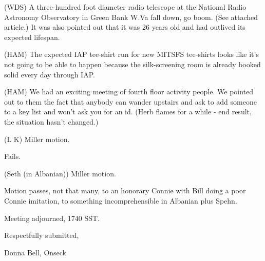 \documentclass[12pt]{article}
\begin{document}
(WDS) A three-hundred foot diameter radio telescope at the National Radio Astronomy Observatory in Green Bank W.Va fall down, go boom. (See attached article.) It was also pointed out that it was 26 years old and had outlived its expected lifespan.

(HAM) The expected IAP tee-shirt run for new MITSFS tee-shirts looks like it's not going to be able to happen because the silk-screening room is already booked solid every day through IAP.

(HAM) We had an exciting meeting of fourth floor activity people. We pointed out to them the fact that anybody can wander upstairs and ask to add someone to a key list and won't ask you for an id.  (Herb flames for a while - end result, the situation hasn't changed.)

(L K) Miller motion. 

Fails.

(Seth (in Albanian)) Miller motion.

Motion passes, not that many, to an honorary Connie with Bill doing a poor Connie imitation, to something incomprehensible in Albanian plus Spehn.

\vspace{12pt}

\noindent
Meeting adjourned, 1740 SST.

\vspace{18pt}

\centerline{Respectfully submitted,}
\centerline{Donna Bell, Onseck}
\end{document}
